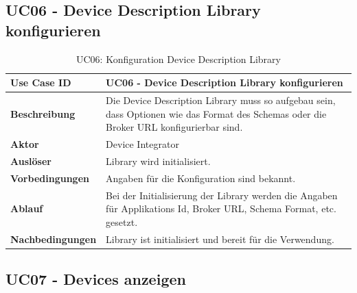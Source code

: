 \subsection{UC06 - Device Description Library konfigurieren}
\begin{table}[H]
\begin{tabularx}{\textwidth}{|l|X|}

 \hline
 {\bf Use Case ID }    & UC06 - Device Description Library konfigurieren \\  \hline
 {\bf Beschreibung }   & Die Device Description Library muss so aufgebau sein, dass Optionen wie das Format des Schemas oder die Broker URL konfigurierbar sind.  \\ \hline
 {\bf Aktor }          & Device Integrator \\ \hline
 {\bf Auslöser }       & Library wird initialisiert. \\ \hline
 {\bf Vorbedingungen } & Angaben für die Konfiguration sind bekannt. \\ \hline
 {\bf Ablauf }         & Bei der Initialisierung der Library werden die Angaben für Applikations Id, Broker URL, Schema Format, etc. gesetzt. \\ \hline
 {\bf Nachbedingungen} & Library ist initialisiert und bereit für die Verwendung. \\ \hline
  
\end{tabularx}
\caption{UC06: Konfiguration Device Description Library}
\end{table}

\subsection{UC07 - Devices anzeigen}

